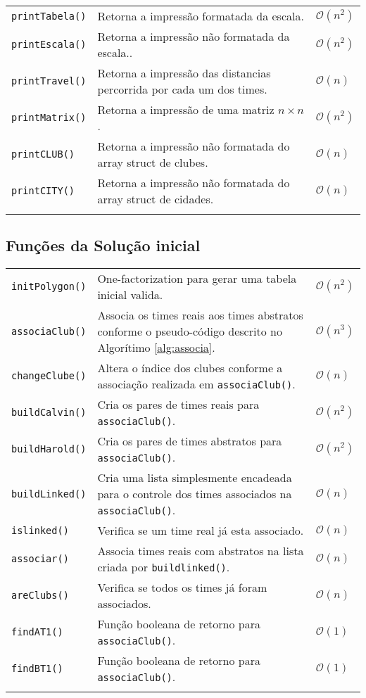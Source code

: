 \documentclass[12pt,a4paper]{article}
\begin{document}
\begin{longtable}{p{3cm} p{11cm} p{1cm}}
	\texttt{printTabela()} & Retorna a impressão formatada da escala. & $\mathcal{O}(n^2)$ \\
	\texttt{printEscala()} & Retorna a impressão não formatada da escala.. & $\mathcal{O}(n^2)$ \\
	\texttt{printTravel()} & Retorna a impressão das distancias percorrida por cada um dos times. & $\mathcal{O}(n)$ \\
	\texttt{printMatrix()} & Retorna a impressão de uma matriz $n \times n$. & $\mathcal{O}(n^2)$ \\
	\texttt{printCLUB()} & Retorna a impressão não formatada do array struct de clubes. & $\mathcal{O}(n)$ \\
	\texttt{printCITY()} & Retorna a impressão não formatada do array struct de cidades. & $\mathcal{O}(n)$ \\
	\label{tab:print}
\end{longtable}
\vspace{-0.5cm}

\subsection{Funções da Solução inicial}
	
\begin{longtable}{p{3cm} p{11cm} p{1cm}}
	\texttt{initPolygon()} & One-factorization para gerar uma tabela inicial valida. & $\mathcal{O}(n^2)$ \\
	\texttt{associaClub()} & Associa os times reais aos times abstratos conforme o pseudo-código descrito no Algorítimo \ref{alg:associa}. & $\mathcal{O}(n^3)$ \\
	\texttt{changeClube()} & Altera o índice dos clubes conforme a associação realizada em \texttt{associaClub()}. & $\mathcal{O}(n)$ \\
	\texttt{buildCalvin()} & Cria os pares de times reais para \texttt{associaClub()}. & $\mathcal{O}(n^2)$ \\
	\texttt{buildHarold()} & Cria os pares de times abstratos para \texttt{associaClub()}. & $\mathcal{O}(n^2)$ \\
	\texttt{buildLinked()} & Cria uma lista simplesmente encadeada para o controle dos times associados na \texttt{associaClub()}. & $\mathcal{O}(n)$ \\
	\texttt{islinked()} & Verifica se um time real já esta associado. & $\mathcal{O}(n)$ \\
	\texttt{associar()} & Associa times reais com abstratos na lista criada por \texttt{buildlinked()}. & $\mathcal{O}(n)$ \\
	\texttt{areClubs()} & Verifica se todos os times já foram associados. & $\mathcal{O}(n)$ \\
	\texttt{findAT1()} & Função booleana de retorno para \texttt{associaClub()}. & $\mathcal{O}(1)$ \\
	\texttt{findBT1()} & Função booleana de retorno para \texttt{associaClub()}. & $\mathcal{O}(1)$ \\
	\label{tab:s0}
\end{longtable}
\vspace{-0.5cm}
\end{document}
